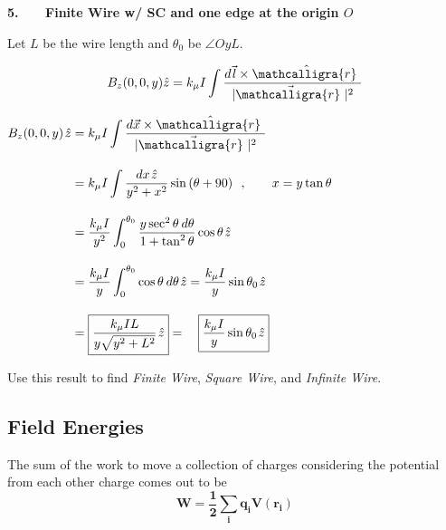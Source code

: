 \documentclass[12pt]{article}
\newcommand{\scripty}[1]{\ensuremath{\mathcalligra{#1}}}
\newcommand{\cursrr}{\scripty{r}\ }
\newcommand{\hs}{\hspace{1pt}} %
\newcommand{\hsvec}[1]{\vec{\hs #1}} %
\begin{document}
\begin{minipage}[t]{.48\textwidth}
	\textbf{5. \ \ \ Finite Wire w/ SC and one edge at the origin \(O\)}
	
	\vspace{10pt}	
	Let \(L\) be the wire length and \(\theta_0\) be \(\angle OyL\).

	\vspace{5pt}
	\[ \displaystyle B_z(0,0,y) \hat{z} = k_\mu I \int \frac{ d\hsvec{l} \times \hat{\cursrr} }{| \vec{\cursrr} |^2}\]

	\vspace{10pt}
	\(\begin{aligned}
		B_z(0,0,y) \hs \hat{z}
			& = k_\mu I \int \frac{ d\vec{x} \times \hat{\cursrr} }{| \vec{\cursrr} |^2}
				\\[10pt]
			& = k_\mu I \int \frac{dx \hs \hat{z} }{y^2 + x^2} \sin{(\theta+90)}
				\ \ , \hspace{20pt} x = y \tan{\theta}
				\\[10pt]
			& = \frac{k_\mu I}{y^2} \int_0^{\theta_0} 
				\frac{y \sec^2{\theta} \hs\hs d\theta}{1 + \tan^2{\theta}} \cos{\theta} \hs \hat{z} 
				\\[10pt]
			& = \frac{k_\mu I}{y} \int_0^{\theta_0} \cos{\theta} \hs\hs d\theta \hs \hat{z} 
				= \frac{k_\mu I}{y} \sin{\theta_0} \hs \hat{z} 
				\\[10pt]
			& = \boxed{ \frac{k_\mu I L}{y \sqrt{y^2+L^2}} \hs \hat{z} } 
				= \quad \boxed{ \frac{k_\mu I}{y} \sin{\theta_0} \hs \hat{z} }
	\end{aligned}\)

	\vspace{30pt}
	Use this result to find \textit{Finite Wire}, \textit{Square Wire}, and \textit{Infinite Wire}.
\end{minipage}

%
%
\newpage
\subsection{Field Energies}
The sum of the work to move a collection of charges considering 
the potential from each other charge comes out to be
\[ \boldsymbol{ W = \frac{1}{2} \sum_i q_i V(r_i) } \]
\end{document}

